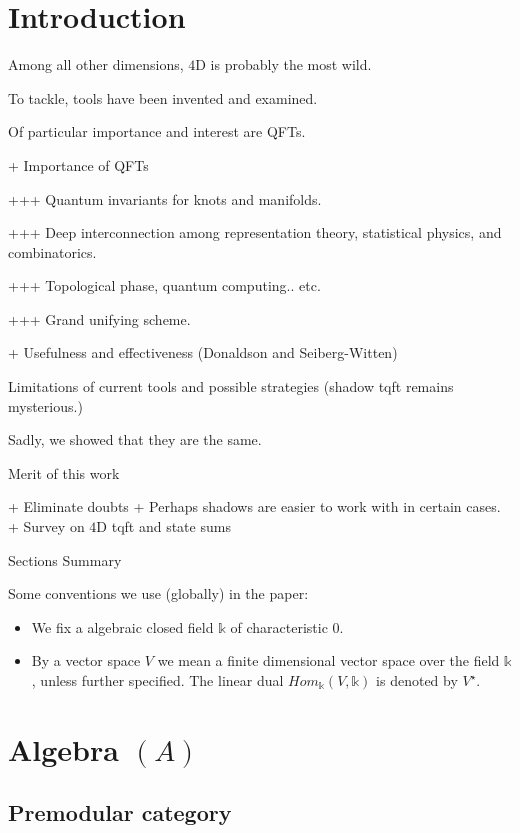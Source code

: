 \section{Introduction}

\noindent Among all other dimensions, $4$D is probably the most wild.

\noindent To tackle, tools have been invented and examined.

\noindent Of particular importance and interest are QFTs.

\noindent + Importance of QFTs

\noindent +++ Quantum invariants for knots and manifolds.

\noindent +++ Deep interconnection among representation theory, statistical
physics, and combinatorics.

\noindent +++ Topological phase, quantum computing.. etc.

\noindent +++ Grand unifying scheme.

\noindent + Usefulness and effectiveness (Donaldson and Seiberg-Witten)

\noindent Limitations of current tools and possible strategies (shadow tqft
remains mysterious.)

\noindent Sadly, we showed that they are the same.

\noindent Merit of this work

\noindent + Eliminate doubts
\noindent + Perhaps shadows are easier to work with in certain cases.
\noindent + Survey on $4$D tqft and state sums

\noindent Sections Summary

\noindent Some conventions we use (globally) in the paper:
\begin{itemize}
  \item We fix a algebraic closed field $\mathbb{k}$ of
        characteristic $0$.
  \item By a vector space $V$ we mean a finite dimensional vector
        space over the field $\mathbb{k}$, unless further
        specified. The linear dual
        $Hom_{\mathbb{k}}(V,\mathbb{k})$ is denoted by
        $V^{\star}$.
\end{itemize}

\section{Algebra $(A)$}
\subsection{Premodular category}


